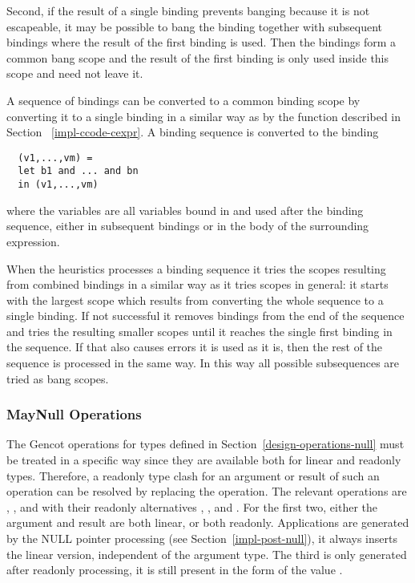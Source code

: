Second, if the result of a single binding prevents banging because it is not escapeable, it may be possible to bang the binding
together with subsequent bindings where the result of the first binding is used. Then the bindings form a common bang scope
and the result of the first binding is only used inside this scope and need not leave it.

A sequence of bindings can be converted to a common binding scope by converting it to a single binding in a similar way as by
the function  described in Section ~\ref{impl-ccode-cexpr}. A binding sequence  is converted
to the binding
\begin{verbatim}
  (v1,...,vm) =
  let b1 and ... and bn
  in (v1,...,vm)
\end{verbatim}
where the variables  are all variables bound in  and used after the binding sequence, either
in subsequent bindings or in the body of the surrounding  expression.

When the heuristics processes a binding sequence it tries the scopes resulting from combined bindings in a similar way as it
tries scopes in general: it starts with the largest scope which results from converting the whole sequence to a single binding.
If not successful it removes bindings from the end of the sequence and tries the resulting smaller scopes until it reaches the
single first binding in the sequence. If that also causes errors it is used as it is, then the rest of the sequence is processed
in the same way. In this way all possible subsequences are tried as bang scopes.

\subsubsection{MayNull Operations}

The Gencot operations for  types defined in Section~\ref{design-operations-null} must be treated in a specific
way since they are available both for linear and readonly types. Therefore, a readonly type clash for an argument or result
of such an operation can be resolved by replacing the operation. The relevant operations are , ,
and  with their readonly alternatives , , and . For the first two,
either the argument and result are both linear, or both readonly. Applications are generated by the NULL pointer processing
(see Section~\ref{impl-post-null}), it always inserts the linear version, independent of the argument type. The third is only
generated after readonly processing, it is still present in the form of the value .

